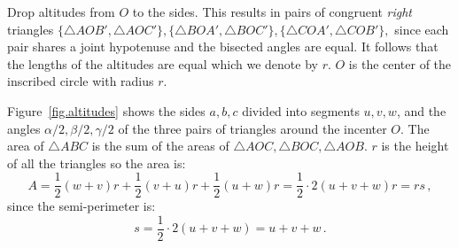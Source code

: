 Drop altitudes from $O$ to the sides. This results in pairs of congruent \emph{right} triangles $\{\triangle AOB', \triangle AOC'\},\{\triangle BOA', \triangle BOC'\},\{\triangle COA', \triangle COB'\},$ since each pair shares a joint hypotenuse and the bisected angles are equal. It follows that the lengths of the altitudes are equal which we denote by $r$. $O$ is the center of the inscribed circle with radius $r$.

Figure~\ref{fig.altitudes} shows the sides $a,b,c$ divided into segments $u,v,w$, and the angles $\alpha/2,\beta/2,\gamma/2$ of the three pairs of triangles around the incenter $O$. The area of $\triangle ABC$ is the sum of the areas of $\triangle AOC, \triangle BOC, \triangle AOB$. $r$ is the height of all the triangles so the area is:
\begin{equation}
A = \frac{1}{2}(w+v)r + \frac{1}{2}(v+u)r + \frac{1}{2}(u+w)r = \frac{1}{2}\cdot 2(u+v+w)r = rs\,, \label{eq.area1}
\end{equation}
since the semi-perimeter is:
\begin{equation}
s=\frac{1}{2}\cdot 2 (u+v+w)=u+v+w\,.\label{eq.semi}
\end{equation}

\vspace*{-8ex}

